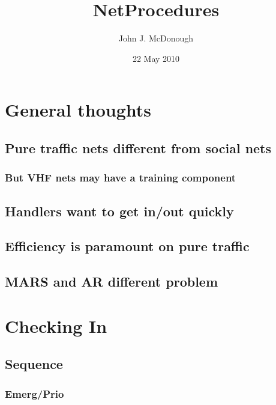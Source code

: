 \documentclass[11pt]{article}
\title{NetProcedures}
\author{John J. McDonough}
\date{22 May 2010}
\begin{document}
\maketitle

\setcounter{tocdepth}{3}
\tableofcontents
\vspace*{1cm}
\section{General thoughts}
\label{sec-1}

\subsection{Pure traffic nets different from social nets}
\label{sec-1.1}

\subsubsection{But VHF nets may have a training component}
\label{sec-1.1.1}

\subsection{Handlers want to get in/out quickly}
\label{sec-1.2}

\subsection{Efficiency is paramount on pure traffic}
\label{sec-1.3}

\subsection{MARS and AR different problem}
\label{sec-1.4}

\section{Checking In}
\label{sec-2}

\subsection{Sequence}
\label{sec-2.1}

\subsubsection{Emerg/Prio}
\label{sec-2.1.1}
\end{document}
